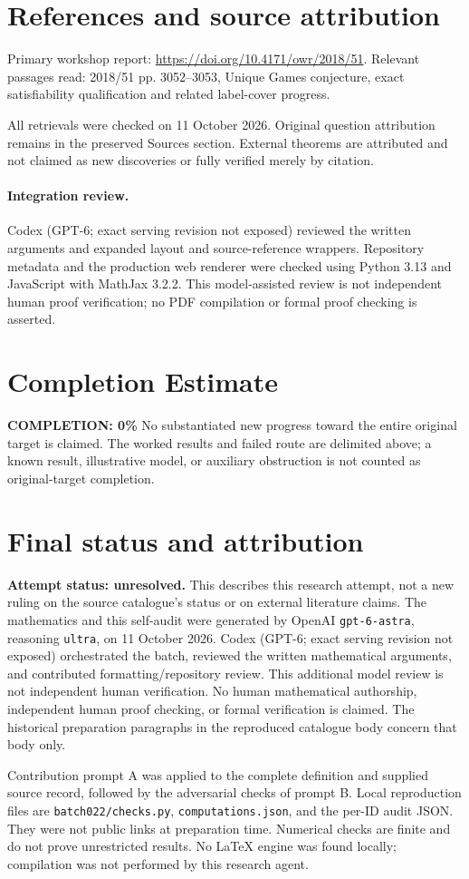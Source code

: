 \documentclass[11pt]{article}
\begin{document}
\section{References and source attribution}
Primary workshop report: \url{https://doi.org/10.4171/owr/2018/51}. Relevant passages read: 2018/51 pp. 3052--3053, Unique Games conjecture, exact satisfiability qualification and related label-cover progress.

All retrievals were checked on 11 October 2026. Original question attribution remains in the preserved Sources section. External theorems are attributed and not claimed as new discoveries or fully verified merely by citation.


\paragraph{Integration review.} Codex (GPT-6; exact serving revision not exposed) reviewed the written arguments and expanded layout and source-reference wrappers. Repository metadata and the production web renderer were checked using Python 3.13 and JavaScript with MathJax 3.2.2. This model-assisted review is not independent human proof verification; no PDF compilation or formal proof checking is asserted.

\section{Completion Estimate}
\noindent\textbf{COMPLETION: 0\%}
No substantiated new progress toward the entire original target is claimed. The worked results and failed route are delimited above; a known result, illustrative model, or auxiliary obstruction is not counted as original-target completion.

\section{Final status and attribution}
\textbf{Attempt status: unresolved.} This describes this research attempt, not a new ruling on the source catalogue's status or on external literature claims.
The mathematics and this self-audit were generated by OpenAI \texttt{gpt-6-astra}, reasoning \texttt{ultra}, on 11 October 2026. Codex (GPT-6; exact serving revision not exposed) orchestrated the batch, reviewed the written mathematical arguments, and contributed formatting/repository review. This additional model review is not independent human verification. No human mathematical authorship, independent human proof checking, or formal verification is claimed. The historical preparation paragraphs in the reproduced catalogue body concern that body only.

Contribution prompt A was applied to the complete definition and supplied source record, followed by the adversarial checks of prompt B. Local reproduction files are \texttt{batch022/checks.py}, \texttt{computations.json}, and the per-ID audit JSON. They were not public links at preparation time. Numerical checks are finite and do not prove unrestricted results. No LaTeX engine was found locally; compilation was not performed by this research agent.
\end{document}
